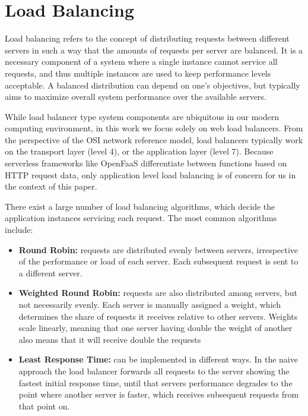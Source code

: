 \section{Load Balancing}
Load balancing refers to the concept of distributing requests between different servers in such a way that the amounts of requests per server are balanced.
It is a necessary component of a system where a single instance cannot service all requests, and thus multiple instances are used to keep performance levels acceptable.
A balanced distribution can depend on one's objectives, but typically aims to maximize overall system performance over the available servers\cite{cardelliniDynamicLoadBalancing1999a}.

While load balancer type system components are ubiquitous in our modern computing environment, in this work we focus solely on web load balancers.
From the perspective of the OSI network reference model\cite{dayOSIReferenceModel1983}, load balancers typically work on the transport layer (level 4), or the application layer (level 7).
Because serverless frameworks like OpenFaaS differentiate between functions based on HTTP request data, only application level load balancing is of concern for us in the context of this paper.

There exist a large number of load balancing algorithms, which decide the application instances servicing each request.
The most common algorithms include:
\begin{itemize}
    \item \textbf{Round Robin:} requests are distributed evenly between servers, irrespective of the performance or load of each server. Each subsequent request is sent to a different server.
    \item \textbf{Weighted Round Robin:} requests are also distributed among servers, but not necessarily evenly. Each server is manually assigned a weight, which determines the share of requests it receives relative to other servers. Weights scale linearly, meaning that one server having double the weight of another also means that it will receive double the requests
    \item \textbf{Least Response Time:} can be implemented in different ways. In the naive approach the load balancer forwards all requests to the server showing the fastest initial response time, until that servers performance degrades to the point where another server is faster, which receives subsequent requests from that point on.
\end{itemize}

